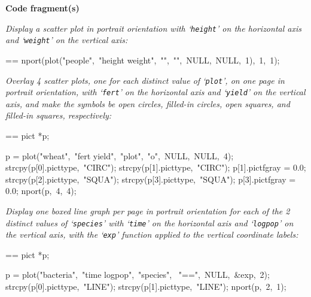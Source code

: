 \documentclass{book}
\makeatletter
\newenvironment{Texinfopreformatted}{%
  \par\GNUTobeylines\obeyspaces\frenchspacing\parskip=\z@\parindent=\z@}{}
{\catcode`\^^M=13 \gdef\GNUTobeylines{\catcode`\^^M=13 \def^^M{\null\par}}}
\newenvironment{Texinfoindented}{\begin{list}{}{}\item\relax}{\end{list}}
\renewcommand{\_}{\Texinfounderscore\discretionary{}{}{}}
\makeatother
\begin{document}
\noindent{}\textbf{Code fragment(s)}

\emph{Display a scatter plot in portrait orientation
with `\texttt{height}' on the horizontal
axis and `\texttt{weight}' on the vertical axis:}
\begin{Texinfoindented}
\begin{Texinfopreformatted}%
\ttfamily nport(plot("people",\ "height weight",\ "",\ "",\ NULL,\ NULL,\ 1),\ 1,\ 1);
\end{Texinfopreformatted}
\end{Texinfoindented}

\emph{Overlay 4 scatter plots, one for each distinct value
of `\texttt{plot}', on one page in portrait orientation,
with `\texttt{fert}' on the horizontal
axis and `\texttt{yield}' on the vertical axis, and make the symbols
be open circles, filled-in circles, open squares, and filled-in
squares, respectively:}
\begin{Texinfoindented}
\begin{Texinfopreformatted}%
\ttfamily pict *p;

p = plot("wheat",\ "fert yield",\ "plot",\ "o",\ NULL,\ NULL,\ 4);
strcpy(p[0].pict\_type,\ "CIRC");
strcpy(p[1].pict\_type,\ "CIRC");
p[1].pict\_fgray = 0.0;
strcpy(p[2].pict\_type,\ "SQUA");
strcpy(p[3].pict\_type,\ "SQUA");
p[3].pict\_fgray = 0.0;
nport(p,\ 4,\ 4);
\end{Texinfopreformatted}
\end{Texinfoindented}

\emph{Display one boxed line graph per page in portrait orientation
for each of the 2 distinct values of `\texttt{species}'
with `\texttt{time}' on the horizontal
axis and `\texttt{logpop}' on the vertical axis, with
the `\texttt{exp}' function applied to the vertical coordinate labels:}
\begin{Texinfoindented}
\begin{Texinfopreformatted}%
\ttfamily pict *p;

p = plot("bacteria",\ "time logpop",\ "species",
\                                     "==",\ NULL,\ \&exp,\ 2);
strcpy(p[0].pict\_type,\ "LINE");
strcpy(p[1].pict\_type,\ "LINE");
nport(p,\ 2,\ 1);
\end{Texinfopreformatted}
\end{Texinfoindented}
\end{document}
